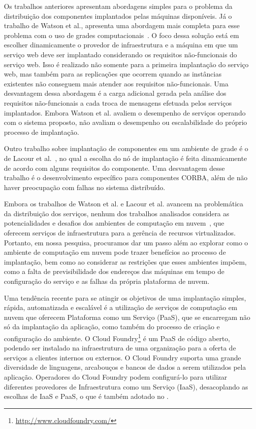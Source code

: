 Os trabalhos anteriores apresentam abordagens simples para o problema da distribuição dos componentes implantados pelas máquinas disponíveis. Já o trabalho de Watson et al., apresenta uma abordagem mais completa para esse problema com o uso de grades computacionais~\cite{Watson2006Dynasoar}. O foco dessa solução está em escolher dinamicamente o provedor de infraestrutura e a máquina em que um serviço web deve ser implantado considerando os requisitos não-funcionais do serviço web. Isso é realizado não somente para a primeira implantação do serviço web, mas também para as replicações que ocorrem quando as instâncias existentes não conseguem mais atender aos requisitos não-funcionais. Uma desvantagem dessa abordagem é a carga adicional gerada pela análise dos requisitos não-funcionais a cada troca de mensagens efetuada pelos serviços implantados. Embora Watson et al. avaliem o desempenho de serviços operando com o sistema proposto, não avaliam o desempenho ou escalabilidade do próprio processo de implantação.

Outro trabalho sobre implantação de componentes em um ambiente de grade é o de Lacour et al.~\cite{Lacour2004Corba}, no qual a escolha do nó de implantação é feita dinamicamente de acordo com alguns requisitos do componente. Uma desvantagem desse trabalho é o desenvolvimento específico para componentes CORBA, além de não haver preocupação com falhas no sistema distribuído.

Embora os trabalhos de Watson et al. e Lacour et al. avancem na problemática da distribuição dos serviços, nenhum dos trabalhos analisados considera as potencialidades e desafios dos ambientes de computação em nuvem~\cite{Amazon2012Practices}, que oferecem serviços de infraestrutura para a gerência de recursos virtualizados. Portanto, em nossa pesquisa, procuramos dar um passo além ao explorar como o ambiente de computação em nuvem pode trazer benefícios ao processo de implantação, bem como ao considerar as restrições que esses ambientes impõem, como a falta de previsibilidade dos endereços das máquinas em tempo de configuração do serviço e as falhas da própria plataforma de nuvem.

Uma tendência recente para se atingir os objetivos de uma implantação simples, rápida, automatizada e escalável é a utilização de serviços de computação em nuvem que oferecem Plataforma como um Serviço (PaaS), que se encarregam não só da implantação da aplicação, como também do processo de criação e configuração do ambiente. O Cloud Foundry\footnote{\url{http://www.cloudfoundry.com/}} é um PaaS de código aberto, podendo ser instalado na infraestrutura de uma organização para a oferta de serviços a clientes internos ou externos. O Cloud Foundry suporta uma grande diversidade de linguagens, arcabouços e bancos de dados a serem utilizados pela aplicação. Operadores do Cloud Foundry podem configurá-lo para utilizar diferentes provedores de Infraestrutura como um Serviço (IaaS), desacoplando as escolhas de IaaS e PaaS, o que é também adotado no \ee. 

